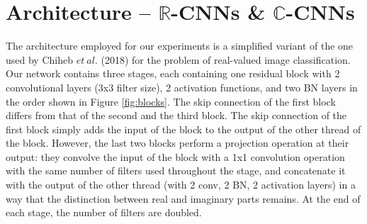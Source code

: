  \section{Architecture -- $\mathbb{R}$-CNNs \& $\mathbb{C}$-CNNs}
 The architecture employed for our experiments is a simplified variant of the one used by Chiheb $et \ al.$ (2018) \cite{trabelsi2018deep} for the problem of real-valued image classification. Our network contains three stages, each containing one residual block with 2 convolutional layers (3x3 filter size), 2 activation functions, and two BN layers in the order shown in Figure \ref{fig:blocks}. The skip connection of the first block differs from that of the second and the third block. The skip connection of the first block simply adds the input of the block to the output of the other thread of the block. However, the last two blocks perform a projection operation at their output: they convolve the input of the block with a 1x1 convolution operation with the same number of filters used throughout the stage, and concatenate it with the output of the other thread (with 2 conv, 2 BN, 2 activation layers) in a way that the distinction between real and imaginary parts remains. At the end of each stage, the number of filters are doubled.
 
